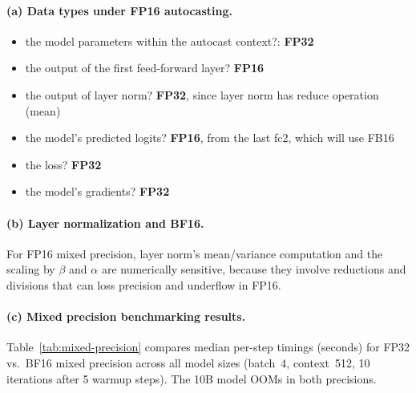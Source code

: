 \documentclass[11pt]{article}
\begin{document}
\paragraph{(a) Data types under FP16 autocasting.}

\begin{itemize}
  \item the model parameters within the autocast context?: \textbf{FP32}
  \item the output of the first feed-forward layer? \textbf{FP16}
  \item the output of layer norm? \textbf{FP32}, since layer norm has reduce operation (mean)
  \item the model's predicted logits? \textbf{FP16}, from the last fc2, which will use FB16
  \item the loss? \textbf{FP32}
  \item the model's gradients? \textbf{FP32}
\end{itemize}


\paragraph{(b) Layer normalization and BF16.}

For FP16 mixed precision, layer norm's mean/variance computation and the scaling by
$\beta$ and $\alpha$ are numerically sensitive, because they involve reductions and divisions 
that can loss precision and underflow in FP16.

\paragraph{(c) Mixed precision benchmarking results.}

Table~\ref{tab:mixed-precision} compares median per-step timings (seconds) for
FP32 vs.\ BF16 mixed precision across all model sizes (batch~4, context~512,
10 iterations after 5 warmup steps).  The 10B model OOMs in both precisions.
\end{document}
